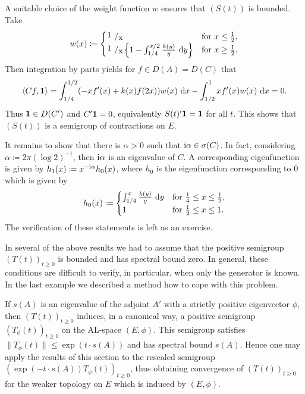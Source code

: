 \begin{example}
A suitable choice of the weight function $w$ ensures that $(S(t))$ is bounded.
Take
\begin{equation}\label{eq:c4-2.14}
w(x) \coloneqq \begin{cases}
    \text{\sfrac{1}{x}} & \text{for } x \leq \frac{1}{2}, \\
    \text{\sfrac{1}{x}} \left\{1 - \int_{1/4}^{x/2} \frac{k(y)}{y} \, \dy \right\} & \text{for } x \geq \frac{1}{2}.
\end{cases}
\end{equation}
Then integration by parts yields for $f \in D(A) = D(C)$ that
\begin{align*}
\langle Cf,\mathbf{1} \rangle = \int_{1/4}^{1/2} (-xf'(x) + k(x)f(2x))w(x) \, \mathop{}\!\mathrm{d}{x} - \int_{1/2}^{1} xf'(x)w(x) \, \mathop{}\!\mathrm{d}{x} = 0.
\end{align*}
Thus $\mathbf{1} \in D(C')$ and $C'\mathbf{1} = 0$, equivalently $S(t)'\mathbf{1} = \mathbf{1}$ for all $t$.
This shows that $(S(t))$ is a semigroup of contractions on $E$.

It remains to show that there is $\alpha > 0$ such that $\mathrm{i}\alpha \in \sigma(C)$.
In fact, considering $\alpha \coloneqq 2\pi(\log 2)^{-1}$,  then $\mathrm{i}\alpha$ is an eigenvalue of\/ $C$.
A corresponding eigenfunction is given by $h_{1}(x) \coloneq  x^{-\mathrm{i}\alpha}h_{0}(x)$, where $h_{0}$ is the eigenfunction corresponding to $0$ which is given by
\begin{equation}\label{eq:c4-2.15}
h_{0}(x) \coloneq  \begin{cases}
    \int_{1/4}^{x} \frac{k(y)}{y} \, \dy & \text{for } \frac{1}{4} \leq x \leq \frac{1}{2}, \\
    1 & \text{for } \frac{1}{2} \leq x \leq 1.
\end{cases}
\end{equation}
The verification of these statements is left as an exercise.
\end{example}
In several of the above results we had to assume that the positive semigroup $(T(t))_{t\geq 0}$ is bounded and has spectral bound zero.
In general, these conditions are difficult to verify, in particular, when only the generator is known.
In the last example we described a method how to cope with this problem. 

If\/ $s(A)$ is an eigenvalue of the adjoint $A'$ with a strictly positive eigenvector $\phi$, then $(T(t))_{t\geq 0}$ induces, in a canonical way, a positive semigroup $(T_{\phi}(t))_{t \geq 0}$ on the AL-space $(E,\phi)$.
This semigroup satisfies $\|T_{\phi}(t)\| \leq \exp(t \cdot s(A))$ and has spectral bound $s(A)$.
Hence one may apply the results of this section to the rescaled semigroup $(\exp(-t \cdot s(A))T_{\phi}(t))_{t \geq 0}$, thus obtaining convergence of\/ $(T(t))_{t \geq 0}$ for the weaker topology on $E$ which is induced by $(E,\phi)$.


